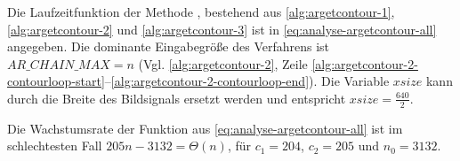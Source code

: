 Die Laufzeitfunktion der Methode , bestehend aus \autoref{alg:argetcontour-1},
 \autoref{alg:argetcontour-2} und \autoref{alg:argetcontour-3} ist in \autoref{eq:analyse-argetcontour-all} angegeben.
 Die dominante Eingabegröße des Verfahrens ist $\mathit{AR\_CHAIN\_MAX} = n$ (Vgl. \autoref{alg:argetcontour-2},
 Zeile \ref{alg:argetcontour-2-contourloop-start}--\ref{alg:argetcontour-2-contourloop-end}). Die Variable
 $\mathit{xsize}$ kann durch die Breite des Bildsignals ersetzt werden und entspricht $\mathit{xsize} = \tfrac{640}{2}$.

Die Wachstumsrate der Funktion aus \autoref{eq:analyse-argetcontour-all} ist im schlechtesten Fall
 $205n - 3132 = \Theta(n)$, für $c_{1} = 204$, $c_{2} = 205$ und $n_{0} = 3132$.
